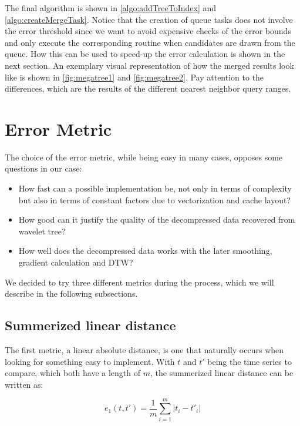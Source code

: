 The final algorithm is shown in \autoref{algo:addTreeToIndex} and \autoref{algo:createMergeTask}. Notice that the creation of queue tasks does not involve the error threshold since we want to avoid expensive checks of the error bounds and only execute the corresponding routine when candidates are drawn from the queue. How this can be used to speed-up the error calculation is shown in the next section. An exemplary visual representation of how the merged results look like is shown in \autoref{fig:megatree1} and \autoref{fig:megatree2}. Pay attention to the differences, which are the results of the different nearest neighbor query ranges.



\section{Error Metric}
\label{sec:algorithm:error}

The choice of the error metric, while being easy in many cases, opposes some questions in our case:

\begin{itemize}
    \item How fast can a possible implementation be, not only in terms of complexity but also in terms of constant factors due to vectorization and cache layout?
    \item How good can it justify the quality of the decompressed data recovered from wavelet tree?
    \item How well does the decompressed data works with the later smoothing, gradient calculation and DTW\@?
\end{itemize}

We decided to try three different metrics during the process, which we will describe in the following subsections.


\subsection{Summerized linear distance}
\label{ssec:algorithm:error:linear}

The first metric, a linear absolute distance, is one that naturally occurs when looking for something easy to implement. With $t$ and $t'$ being the time series to compare, which both have a length of $m$, the summerized linear distance can be written as:

\begin{equation}\label{eq:e1}
    e_1\left(t, t'\right) = \frac{1}{m} \sum_{i=1}^m \left|t_i - t'_i\right|
\end{equation}

